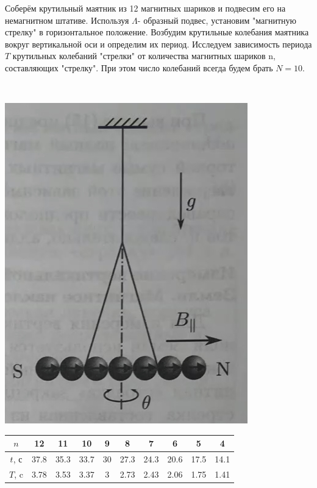 \documentclass[a4paper,12pt]{article}
\begin{document}
\begin{minipage}{0.45\textwidth}
Соберём крутильный маятник из 12 магнитных шариков и подвесим его на немагнитном штативе. Используя $\Lambda$- образный подвес, установим "магнитную стрелку" в горизонтальное положение.
Возбудим крутильные колебания маятника вокруг вертикальной оси и определим их период. Исследуем зависимость периода $T$ крутильных колебаний "стрелки" от количества магнитных шариков n, составляющих "стрелку". При этом число колебаний
всегда будем брать $N = 10$.
\end{minipage}
\begin{minipage}{0.1\textwidth}
\
\end{minipage}
\begin{minipage}{0.45\textwidth}
\begin{center}
\includegraphics[width=0.7\linewidth]{3.jpg}\\
\end{center}
\end{minipage}

\begin{table}[h]
\begin{tabular}{|c|c|c|c|c|c|c|c|c|c|}
\hline
$n$    & 12   & 11   & 10   & 9  & 8    & 7    & 6    & 5    & 4    \\ \hline
$t$, с & 37.8 & 35.3 & 33.7 & 30 & 27.3 & 24.3 & 20.6 & 17.5 & 14.1 \\ \hline
$T$, c & 3.78 & 3.53 & 3.37 & 3  & 2.73 & 2.43 & 2.06 & 1.75 & 1.41 \\ \hline
\end{tabular}
\end{table}
\end{document}
